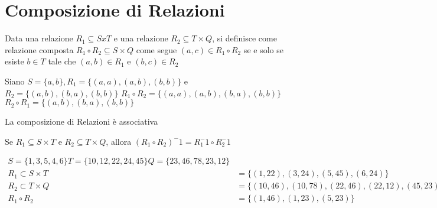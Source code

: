 \section{Composizione di Relazioni}
Data una relazione $R_1 \subseteq S x T$ e una relazione $R_2 \subseteq T \times Q$,
si definisce come relazione composta $R_1 \circ R_2 \subseteq S \times Q$ come segue
$(a,c) \in R_1 \circ R_2$ se e solo se  esiste $b \in T$ tale che $(a,b) \in R_1$ e $(b,c) \in R_2$

Siano $S = \{ a,b \}, R_1 = \{ (a,a),(a,b),(b,b) \}$ e $R_2 = \{ (a,b),(b,a),(b,b) \}$
$R_1 \circ R_2 = \{ (a,a),(a,b),(b,a),(b,b) \}$ \newline
$R_2 \circ R_1 = \{ (a,b),(b,a),(b,b) \}$

\begin{prop}
La composizione di Relazioni è associativa
\end{prop}

\begin{thm}
Se $R_1 \subseteq S \times T$ e $R_2 \subseteq T \times Q$, allora $(R_1 \circ R_2)^-1 = R_1^-1 \circ R_2^-1$
\end{thm}


\begin{equation*}
\begin{split}
S = \{ 1,3,5,4,6\} T = \{10,12,22,24,45\} Q = \{23,46,78,23,12\} \\
R_1 \subset S \times T & = \{(1,22),(3,24),(5,45),(6,24)\} \\
R_2 \subset T \times Q & = \{(10,46),(10,78),(22,46),(22,12),(45,23)\} \\
R_1 \circ R_2 & = \{(1,46),(1,23),(5,23)\} \\
\end{split}
\end{equation*}
